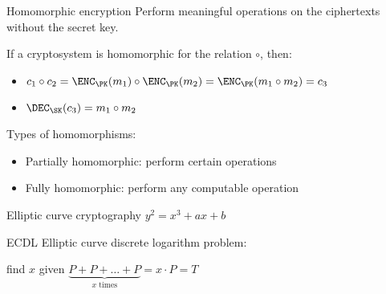 \begin{frame}{Homomorphic encryption}
  Perform meaningful operations on the ciphertexts without the secret key.

  \vspace*{1em}

  \pause
  If a cryptosystem is homomorphic for the relation $\circ$, then:
  \begin{itemize}[<+(1)->]
    \item $c_1 \circ c_2 = \ENC_\PK(m_1) \circ \ENC_\PK(m_2) = \ENC_\PK(m_1 \circ m_2) = c_3$
    \item $\DEC_\SK(c_3) = m_1 \circ m_2$
  \end{itemize}

  \vspace*{1em}

  \pause
  Types of homomorphisms:
  \begin{itemize}[<+(1)->]
    \item Partially homomorphic: perform certain operations
    \item Fully homomorphic: perform any computable operation
  \end{itemize}
\end{frame}

\begin{frame}{Elliptic curve cryptography}
  $y^2 = x^3 + ax + b$
  \vspace*{-2em}
  \begin{center}
  \end{center}
\end{frame}

\begin{frame}{ECDL}
  Elliptic curve discrete logarithm problem:
  \begin{center}
    find $x$ given $\underbrace{P + P + \dots + P}_{x \text{ times}} = x\cdot P = T$
  \end{center}
\end{frame}

